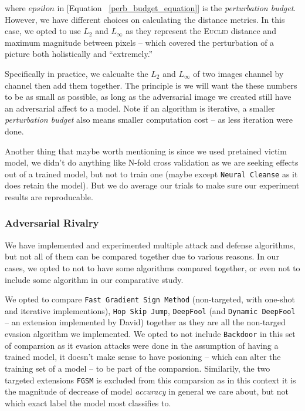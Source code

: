 \documentclass[11pt]{article}
\newcommand{\ilc}{\texttt}
\begin{document}
where $epsilon$ in [Equation \ \ref{perb_budget_equation}] is the \textit{perturbation budget}. However, we have different choices on calculating the distance metrics. In this case, we opted to use $L_2$ and $L_{\infty}$ as they represent the \textsc{Euclid} distance and maximum magnitude between pixels -- which covered the perturbation of a picture both holistically and ``extremely.''

Specifically in practice, we calcualte the $L_2$ and $L_{\infty}$ of two images channel by channel then add them together. The principle is we will want the these numbers to be as small as possible, as long as the adversarial image we created still have an adversarial affect to a model. Note if an algorithm is iterative, a smaller \textit{perturbation budget} also means smaller computation cost -- as less iteration were done.\newline

\noindent Another thing that maybe worth mentioning is since we used pretained victim model, we didn't do anything like N-fold cross validation as we are seeking effects out of a trained model, but not to train one (maybe except \ilc{Neural Cleanse} as it does retain the model). But we do average our trials to make sure our experiment results are reproducable.


\subsubsection{Adversarial Rivalry}

We have implemented and experimented multiple attack and defense algorithms, but not all of them can be compared together due to various reasons. In our cases, we opted to not to have some algorithms compared together, or even not to include some algorithm in our comparative study.

We opted to compare \ilc{Fast Gradient Sign Method} (non-targeted, with one-shot and iterative implementions), \ilc{Hop Skip Jump}, \ilc{DeepFool} (and \ilc{Dynamic DeepFool} -- an extension implemented by David) together as they are all the non-targed evasion algorithm we implemented. We opted to not include \ilc{Backdoor} in this set of comparsion as it evasion attacks were done in the assumption of having a trained model, it doesn't make sense to have posioning -- which can alter the training set of a model -- to be part of the comparsion. Similarily, the two targeted extensions \ilc{FGSM} is excluded from this comparsion as in this context it is the magnitude of decrease of model \textit{accuracy} in general we care about, but not which exact label the model most classifies to.
\end{document}
